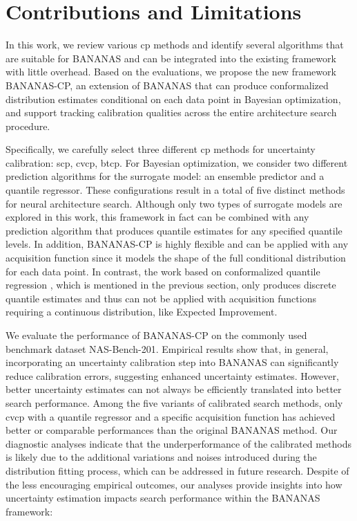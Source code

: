 \documentclass[a4paper,oneside,bibliography=totoc]{scrbook}
\begin{document}
\section{Contributions and Limitations}
In this work, we review various \gls{cp} methods and identify several algorithms that are suitable for BANANAS and can be integrated into the existing framework with little overhead. Based on the evaluations, we propose the new framework BANANAS-CP, an extension of BANANAS that can produce conformalized distribution estimates conditional on each data point in Bayesian optimization, and support tracking calibration qualities across the entire architecture search procedure. 

Specifically, we carefully select three different \gls{cp} methods for uncertainty calibration: \gls{scp}, \gls{cvcp}, \gls{btcp}. For Bayesian optimization, we consider two different prediction algorithms for the surrogate model: an ensemble predictor and a quantile regressor. These configurations result in a total of five distinct methods for neural architecture search. Although only two types of surrogate models are explored in this work, this framework in fact can be combined with any prediction algorithm that produces quantile estimates for any specified quantile levels. In addition, BANANAS-CP is highly flexible and can be applied with any acquisition function since it models the shape of the full conditional distribution for each data point. In contrast, the work based on conformalized quantile regression \cite{salinas2023optimizing}, which is mentioned in the previous section, only produces discrete quantile estimates and thus can not be applied with acquisition functions requiring a continuous distribution, like Expected Improvement.

We evaluate the performance of BANANAS-CP on the commonly used benchmark dataset NAS-Bench-201. Empirical results show that, in general, incorporating an uncertainty calibration step into BANANAS can significantly reduce calibration errors, suggesting enhanced uncertainty estimates. However, better uncertainty estimates can not always be efficiently translated into better search performance. Among the five variants of calibrated search methods, only \gls{cvcp} with a quantile regressor and a specific acquisition function has achieved better or comparable performances than the original BANANAS method. Our diagnostic analyses indicate that the underperformance of the calibrated methods is likely due to the additional variations and noises introduced during the distribution fitting process, which can be addressed in future research. Despite of the  less encouraging empirical outcomes, our analyses provide insights into how uncertainty estimation impacts search performance within the BANANAS framework:
\end{document}
